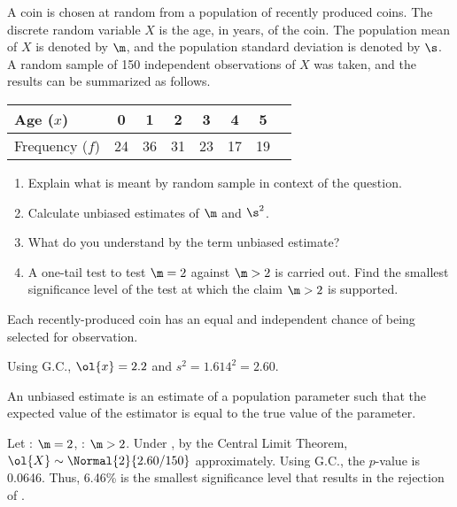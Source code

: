 \begin{problem}
    A coin is chosen at random from a population of recently produced coins. The discrete random variable $X$ is the age, in years, of the coin. The population mean of $X$ is denoted by $\m$, and the population standard deviation is denoted by $\s$. A random sample of 150 independent observations of $X$ was taken, and the results can be summarized as follows.

    \begin{table}[H]
        \centering
        \begin{tabular}{|l|c|c|c|c|c|c|c|}
            \hline
            Age ($x$) & 0 & 1 & 2 & 3 & 4 & 5 \\ \hline
            Frequency ($f$) & 24 & 36 & 31 & 23 & 17 & 19 \\ \hline
        \end{tabular}
    \end{table}

    \begin{enumerate}
        \item Explain what is meant by random sample in context of the question.
        \item Calculate unbiased estimates of $\m$ and $\s^{2}$.
        \item What do you understand by the term unbiased estimate?
        \item A one-tail test to test $\m=2$ against $\m>2$ is carried out. Find the smallest significance level of the test at which the claim $\m>2$ is supported.
    \end{enumerate}
\end{problem}
\begin{solution}
    \begin{ppart}
        Each recently-produced coin has an equal and independent chance of being selected for observation.
    \end{ppart}
    \begin{ppart}
        Using G.C., $\ol{x} = 2.2$ and $s^2 = 1.614^2 = 2.60$.
    \end{ppart}
    \begin{ppart}
        An unbiased estimate is an estimate of a population parameter such that the expected value of the estimator is equal to the true value of the parameter.
    \end{ppart}
    \begin{ppart}
        Let \nullhyp: $\m = 2$, \althyp: $\m > 2$. Under \nullhyp, by the Central Limit Theorem, $\ol{X} \sim \Normal{2}{2.60/150}$ approximately. Using G.C., the $p$-value is 0.0646. Thus, 6.46\% is the smallest significance level that results in the rejection of \nullhyp.
    \end{ppart}
\end{solution}

